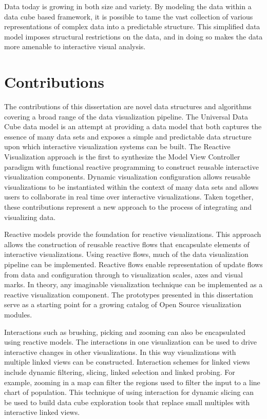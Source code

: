 Data today is growing in both size and variety. By modeling the data within a data cube based framework, it is possible to tame the vast collection of various representations of complex data into a predictable structure. This simplified data model imposes structural restrictions on the data, and in doing so makes the data more amenable to interactive visual analysis.

\section{Contributions}

The contributions of this dissertation are novel data structures and algorithms covering a broad range of the data visualization pipeline. The Universal Data Cube data model is an attempt at providing a data model that both captures the essence of many data sets and exposes a simple and predictable data structure upon which interactive visualization systems can be built. The Reactive Visualization approach is the first to synthesize the Model View Controller paradigm with functional reactive programming to construct reusable interactive visualization components. Dynamic visualization configuration allows reusable visualizations to be instantiated within the context of many data sets and allows users to collaborate in real time over interactive visualizations. Taken together, these contributions represent a new approach to the process of integrating and visualizing data.

Reactive models provide the foundation for reactive visualizations. This approach allows the construction of reusable reactive flows that encapsulate elements of interactive visualizations. Using reactive flows, much of the data visualization pipeline can be implemented. Reactive flows enable representation of update flows from data and configuration through to visualization scales, axes and visual marks. In theory, any imaginable visualization technique can be implemented as a reactive visualization component. The prototypes presented in this dissertation serve as a starting point for a growing catalog of Open Source visualization modules.

Interactions such as brushing, picking and zooming can also be encapsulated using reactive models. The interactions in one visualization can be used to drive interactive changes in other visualizations. In this way visualizations with multiple linked views can be constructed. Interaction schemes for linked views include dynamic filtering, slicing, linked selection and linked probing. For example, zooming in a map can filter the regions used to filter the input to a line chart of population. This technique of using interaction for dynamic slicing can be used to build data cube exploration tools that replace small multiples with interactive linked views.

